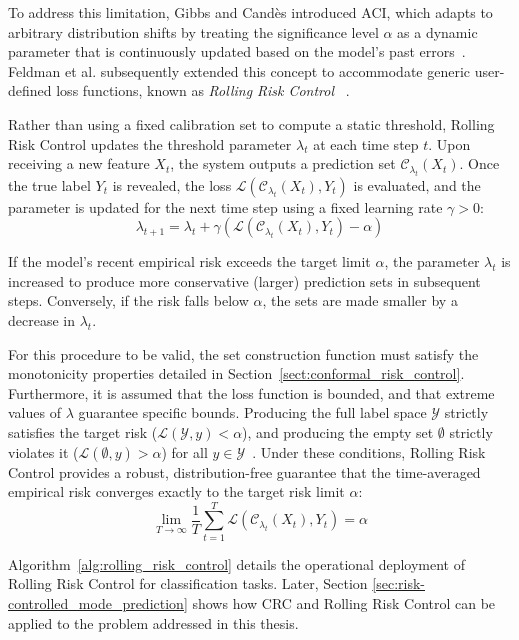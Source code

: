 To address this limitation, Gibbs and Candès introduced \gls{ACI}, which adapts to arbitrary distribution shifts by treating the significance level $\alpha$ as a dynamic parameter that is continuously updated based on the model's past errors~\cite{Gibbs-AdaptiveConformalInference-2021}. Feldman et al. subsequently extended this concept to accommodate generic user-defined loss functions, known as \textit{Rolling Risk Control} ~\cite{Feldman-RiskControlOnlineLearning-2023}.

Rather than using a fixed calibration set to compute a static threshold, Rolling Risk Control updates the threshold parameter $\lambda_t$ at each time step $t$. Upon receiving a new feature $X_t$, the system outputs a prediction set $\mathcal{C}_{\lambda_t}(X_t)$. Once the true label $Y_t$ is revealed, the loss $\mathcal{L}(\mathcal{C}_{\lambda_t}(X_t), Y_t)$ is evaluated, and the parameter is updated for the next time step using a fixed learning rate $\gamma > 0$:
$$\lambda_{t+1} = \lambda_t + \gamma \left( \mathcal{L}(\mathcal{C}_{\lambda_t}(X_t), Y_t) - \alpha \right)$$

If the model's recent empirical risk exceeds the target limit $\alpha$, the parameter $\lambda_t$ is increased to produce more conservative (larger) prediction sets in subsequent steps. Conversely, if the risk falls below $\alpha$, the sets are made smaller by a decrease in $\lambda_t$.

For this procedure to be valid, the set construction function must satisfy the monotonicity properties detailed in Section~\ref{sect:conformal_risk_control}. Furthermore, it is assumed that the loss function is bounded, and that extreme values of $\lambda$ guarantee specific bounds. Producing the full label space $\mathcal{Y}$ strictly satisfies the target risk ($\mathcal{L}(\mathcal{Y}, y) < \alpha$), and producing the empty set $\emptyset$ strictly violates it ($\mathcal{L}(\emptyset, y) > \alpha$) for all $y \in \mathcal{Y}$~\cite{Feldman-RiskControlOnlineLearning-2023}. Under these conditions, Rolling Risk Control provides a robust, distribution-free guarantee that the time-averaged empirical risk converges exactly to the target risk limit $\alpha$:
$$\lim_{T \to \infty} \frac{1}{T} \sum_{t=1}^T \mathcal{L}(\mathcal{C}_{\lambda_t}(X_t), Y_t) = \alpha$$

Algorithm~\ref{alg:rolling_risk_control} details the operational deployment of Rolling Risk Control for classification tasks. Later, Section \ref{sec:risk-controlled_mode_prediction} shows how \gls{CRC} and Rolling Risk Control can be applied to the problem addressed in this thesis.

